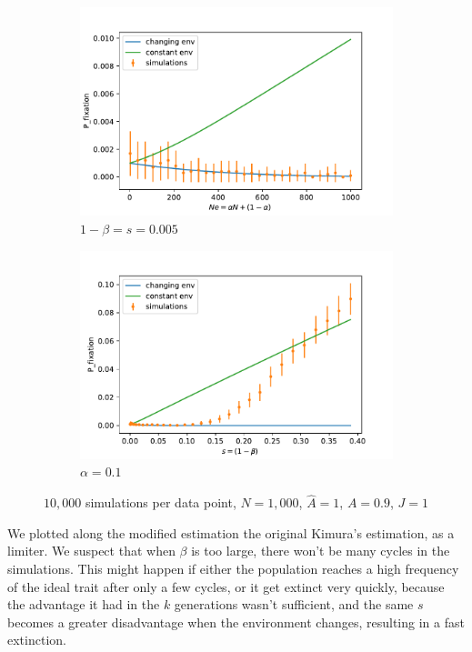 \documentclass[11pt]{article}
\begin{document}
\begin{figure}[t]
  \begin{center}
  \begin{subfigure}[a]{0.49\linewidth}
  \caption{$1-\beta=s=0.005$}
    \includegraphics[width=\linewidth]{../figures/changed_env/ch_env_var_alpha.pdf}
   \end{subfigure}
   \begin{subfigure}[a]{0.49\linewidth}
   \caption{$\alpha=0.1$}
    \includegraphics[width=\linewidth]{../figures/changed_env/ch_env_var_beta.pdf}
   \end{subfigure}
  \end{center}
  \caption{$10,000$ simulations per data point, $N=1,000$, $\hat{A}=1$, $A=0.9$, $J=1$}
  \label{fig:ch_env_alpha_beta}
\end{figure}

We plotted along the modified estimation the original Kimura's estimation, as a limiter. We suspect that when $\beta$ is too large, there won't be many cycles in the simulations. This might happen if either the population reaches a high frequency of the ideal trait after only a few cycles, or it get extinct very quickly, because the advantage it had in the $k$ generations wasn't sufficient, and the same $s$ becomes a greater disadvantage when the environment changes, resulting in a fast extinction.
\end{document}
